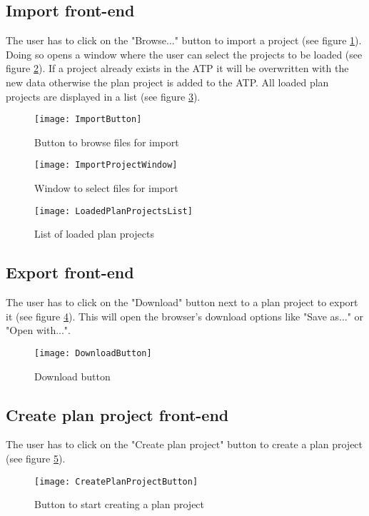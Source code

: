 \subsection{Import front-end}
 The user has to click on the "Browse..." button to import a project (see figure \ref{importButton}). Doing so opens a window where the user can select the projects to be loaded (see figure \ref{importWindow}). If a project already exists in the ATP it will be overwritten with the new data otherwise the plan project is added to the ATP. All loaded plan projects are displayed in a list (see figure \ref{loadedPlanProjects}).
\begin{figure}[H]
	\centering
	\texttt{[image: ImportButton]}
	\caption{Button to browse files for import}
	\label{importButton}
\end{figure}
\begin{figure}[H]
	\centering
	\texttt{[image: ImportProjectWindow]}
	\caption{Window to select files for import}
	\label{importWindow}
\end{figure}
\begin{figure}[H]
	\centering
	\texttt{[image: LoadedPlanProjectsList]}
	\caption{List of loaded plan projects}
	\label{loadedPlanProjects}
\end{figure}

\subsection{Export front-end}
The user has to click on the "Download" button next to a plan project to export it (see figure \ref{downloadButton}). This will open the browser's download options like "Save as..." or "Open with...".
\begin{figure}[H]
	\centering
	\texttt{[image: DownloadButton]}
	\caption{Download button}
	\label{downloadButton}
\end{figure}

\subsection{Create plan project front-end}
The user has to click on the "Create plan project" button to create a plan project (see figure \ref{createPlanProjectButton}). 
\begin{figure}[H]
	\centering
	\texttt{[image: CreatePlanProjectButton]}
	\caption{Button to start creating a plan project}
	\label{createPlanProjectButton}
\end{figure}

